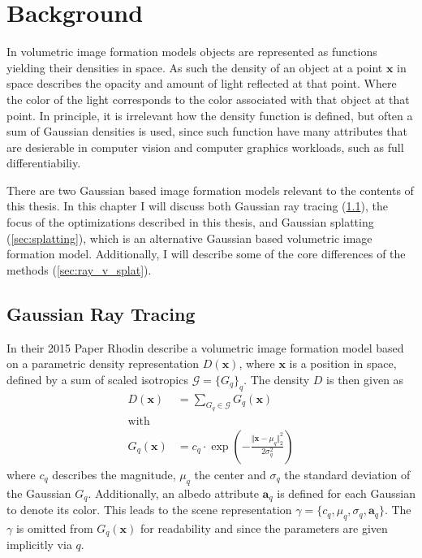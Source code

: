 \documentclass[a4paper, 11pt]{memoir}
\begin{document}
    \chapter{Background}
    \label{ch:background}
    In volumetric image formation models objects are represented as functions yielding their densities in space. As such the
    density of an object at a point $\mathbf{x}$ in space describes the opacity and amount of light reflected at that
    point. Where the color of the light corresponds to the color associated with that object at that point. In principle,
    it is irrelevant how the density function is defined, but often a sum of Gaussian densities is used, since such function
    have many attributes that are desierable in computer vision and computer graphics workloads, such as full differentiabiliy.

    There are two Gaussian based image formation models relevant to the contents of this thesis. In this chapter I will
    discuss both Gaussian ray tracing (\ref{sec:int_grt}), the focus of the optimizations described in this thesis, and Gaussian
    splatting (\ref{sec:splatting}), which is an alternative Gaussian based volumetric image formation model. Additionally,
    I will describe some of the core differences of the methods (\ref{sec:ray_v_splat}).

    \section{Gaussian Ray Tracing}
    \label{sec:int_grt}
    In their 2015 Paper  \cite{Rhodin:2015} Rhodin \etal describe a volumetric image formation
    model based on a parametric density representation $D(\mathbf{x})$, where $\mathbf{x}$ is a position in space,
    defined by a sum of scaled \gls{isotropic}s $\mathcal{G} = \{ G_q \}_q$. The density $D$ is then given as
    \begin{align}
        D(\mathbf{x}) &= \sum_{G_q \in \mathcal{G}} G_q(\mathbf{x})
        \label{eq:density}\\
        \text{with} \nonumber\\
        G_q(\mathbf{x}) &= c_q \cdot \exp{\left( - \frac{\Vert\mathbf{x} - \mu_q\Vert_2^2}{2\sigma_q^2} \right)}
        \label{eq:gaussian}
    \end{align}
    where $c_q$ describes the magnitude, $\mu_q$ the center and $\sigma_q$ the standard deviation of the Gaussian $G_q$.
    Additionally, an \gls{albedo} attribute $\mathbf{a}_q$ is defined for each Gaussian to denote its color. This leads
    to the scene representation $\gamma = \{ c_q, \mu_q, \sigma_q, \mathbf{a}_q \}$. The $\gamma$ is omitted from
    $G_q(\mathbf{x})$ for readability and since the parameters are given implicitly via $q$.
\end{document}
